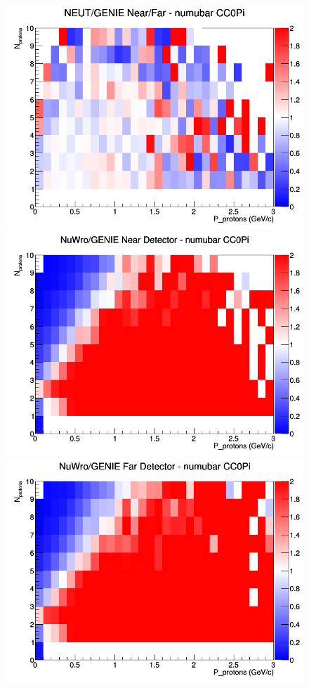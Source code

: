 \begin{figure}[h]
\endminipage
{}
\includegraphics[width=\linewidth]{N_P/nominal/protons/ratios/CC0Pi_NEUT_GENIE_numubar_NF_N_P.png}
\endminipage
\newline
{}
\includegraphics[width=\linewidth]{N_P/nominal/protons/ratios/CC0Pi_NuWro_GENIE_numubar_near_N_P.png}
\endminipage
{}
\includegraphics[width=\linewidth]{N_P/nominal/protons/ratios/CC0Pi_NuWro_GENIE_numubar_far_N_P.png}

\end{figure}

